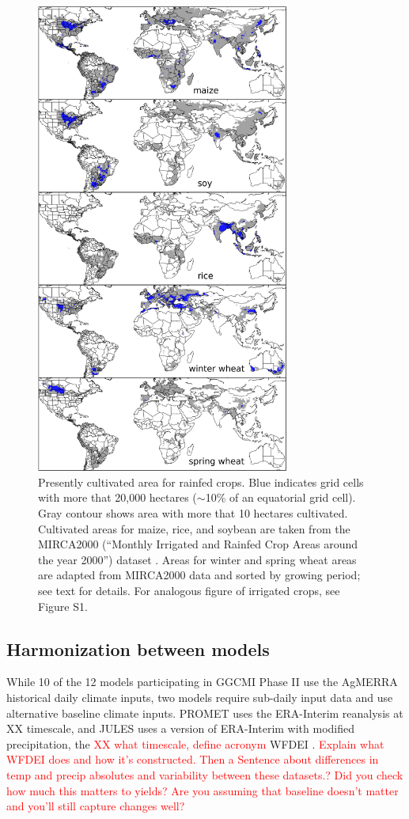 \documentclass[gmd, manuscript]{copernicus} %
\begin{document}
\begin{figure}[ht]
\centering
   \includegraphics[width=8.3cm]{figures/croparea.png}
   \caption{Presently cultivated area for rainfed crops. Blue indicates grid cells with more that 20,000 hectares ($\sim$10\% of an equatorial grid cell). 
   Gray contour shows area with more that 10 hectares cultivated. Cultivated areas for maize, rice, and soybean are taken from the MIRCA2000 (``Monthly Irrigated and Rainfed Crop Areas around the year 2000'') dataset \citep{Portmann2010}. 
   Areas for winter and spring wheat areas are adapted from MIRCA2000 data and sorted by growing period; see text for details.  For analogous figure of irrigated crops, see Figure S1.}
   \label{fig:crop_area}
\end{figure}


\subsection{Harmonization between models}

While 10 of the 12 models participating in GGCMI Phase II use the AgMERRA historical daily climate inputs, two models require sub-daily input data and use alternative baseline climate inputs. PROMET uses the ERA-Interim reanalysis \citep{dee2011era} at XX timescale, and JULES uses a version of ERA-Interim with modified precipitation, the \textcolor{red}{XX what timescale, define acronym} WFDEI \citep{weedon2014wfdei}.  \textcolor{red}{Explain what WFDEI does and how it's constructed. Then a Sentence about differences in temp and precip absolutes and variability between these datasets.? Did you check how much this matters to yields? Are you assuming that baseline doesn't matter and you'll still capture changes well?}
\end{document}
